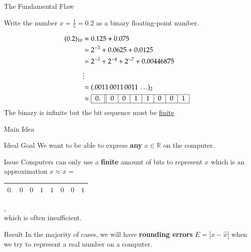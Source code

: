 \documentclass[10pt]{beamer}
\begin{document}

\begin{frame}{The Fundamental Flaw}
\begin{example}
    Write the number $x=\frac{1}{5} = 0.2$ as a binary floating-point number. 
\end{example}


    \begin{align*}
    (0.2)_{10} &= 0.125 + 0.075 \\ 
               &= 2^{-3} + 0.0625 + 0.0125 \\ 
               &= 2^{-3} + 2^{-4} + 2^{-7} + 0.00446875\\
               & \vdots \\
               &=  (.0011\, 0011\, 0011\, \ldots)_2\\
               &\approx \begin{tabular}{|c||c|c|c|c|c|c|c|}\hline
                  $0.$ & $0$ & $0$ & $1$ & $1$ & $0$ & $0$ & $1$\\\hline
                \end{tabular}
    \end{align*}
    The binary is infinite but the bit sequence must be \underline{finite} 

\end{frame}

\begin{frame}{Main Idea}

\begin{block}
{Ideal Goal}
We want to be able to express \textbf{any} $x\in\mathbb{R}$ on the computer.    
\end{block}

\begin{block}{Issue}
Computers can only use a \textbf{finite} amount of bits to represent $x$ which is an approximation $x\approx\hat{x}=$
\begin{tabular}{|c||c|c|c|c|c|c|c|}\hline
   $0.$ & $0$ & $0$ & $1$ & $1$ & $0$ & $0$ & $1$\\\hline
\end{tabular},\\ 
which is often insufficient.
\end{block}

\begin{block}{Result}
In the majority of cases, we will have \textbf{rounding errors} $E = |x-\hat{x}|$ when we try to represent a real number on a computer.
\end{block}

\end{frame}
\end{document}
